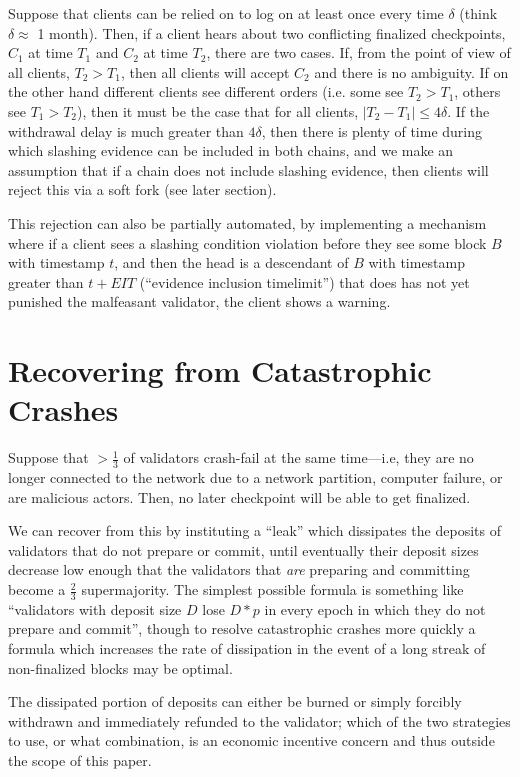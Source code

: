 \documentclass[12pt, final]{article}
\begin{document}
Suppose that clients can be relied on to log on at least once every time $\delta$ (think $\delta \approx$ 1 month). Then, if a client hears about two conflicting finalized checkpoints, $C_1$ at time $T_1$ and $C_2$ at time $T_2$, there are two cases. If, from the point of view of all clients, $T_2 > T_1$, then all clients will accept $C_2$ and there is no ambiguity. If on the other hand different clients see different orders (i.e. some see $T_2 > T_1$, others see $T_1 > T_2$), then it must be the case that for all clients, $|T_2 - T_1| \le 4\delta$. If the withdrawal delay is much greater than $4\delta$, then there is plenty of time during which slashing evidence can be included in both chains, and we make an assumption that if a chain does not include slashing evidence, then clients will reject this via a soft fork (see later section).

This rejection can also be partially automated, by implementing a mechanism where if a client sees a slashing condition violation before they see some block $B$ with timestamp $t$, and then the head is a descendant of $B$ with timestamp greater than $t + EIT$ (``evidence inclusion timelimit'') that does has not yet punished the malfeasant validator, the client shows a warning.

\section{Recovering from Catastrophic Crashes}
\label{sect:leak}

Suppose that $>\frac{1}{3}$ of validators crash-fail at the same time---i.e, they are no longer connected to the network due to a network partition, computer failure, or are malicious actors. Then, no later checkpoint will be able to get finalized.

We can recover from this by instituting a ``leak'' which dissipates the deposits of validators that do not prepare or commit, until eventually their deposit sizes decrease low enough that the validators that \textit{are} preparing and committing become a $\frac{2}{3}$ supermajority. The simplest possible formula is something like ``validators with deposit size $D$ lose $D * p$ in every epoch in which they do not prepare and commit'', though to resolve catastrophic crashes more quickly a formula which increases the rate of dissipation in the event of a long streak of non-finalized blocks may be optimal.

The dissipated portion of deposits can either be burned or simply forcibly withdrawn and immediately refunded to the validator; which of the two strategies to use, or what combination, is an economic incentive concern and thus outside the scope of this paper.
\end{document}
